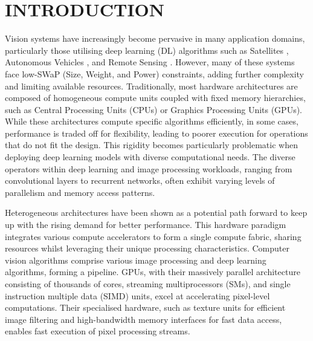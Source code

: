 \documentclass[]{spie}  %
\begin{document}


\section{INTRODUCTION}
\label{sec:intro}
Vision systems have increasingly become pervasive in many application domains, particularly those utilising deep learning (DL) algorithms such as Satellites \cite{10.1145/2491956.2462176}, Autonomous Vehicles \cite{kuutti2020survey}, and Remote Sensing \cite{YUAN2020111716}. However, many of these systems face low-SWaP (Size, Weight, and Power) constraints, adding further complexity and limiting available resources. Traditionally, most hardware architectures are composed of homogeneous compute units coupled with fixed memory hierarchies, such as Central Processing Units (CPUs) or Graphics Processing Units (GPUs). While these architectures compute specific algorithms efficiently, in some cases, performance is traded off for flexibility, leading to poorer execution for operations that do not fit the design. This rigidity becomes particularly problematic when deploying deep learning models with diverse computational needs. The diverse operators within deep learning and image processing workloads, ranging from convolutional layers to recurrent networks, often exhibit varying levels of parallelism and memory access patterns.

Heterogeneous architectures have been shown as a potential path forward to keep up with the rising demand for better performance. This hardware paradigm integrates various compute accelerators to form a single compute fabric, sharing resources whilst leveraging their unique processing characteristics. Computer vision algorithms comprise various image processing and deep learning algorithms, forming a pipeline. GPUs, with their massively parallel architecture consisting of thousands of cores, streaming multiprocessors (SMs), and single instruction multiple data (SIMD) units, excel at accelerating pixel-level computations. Their specialised hardware, such as texture units for efficient image filtering and high-bandwidth memory interfaces for fast data access, enables fast execution of pixel processing streams. 
\end{document}
